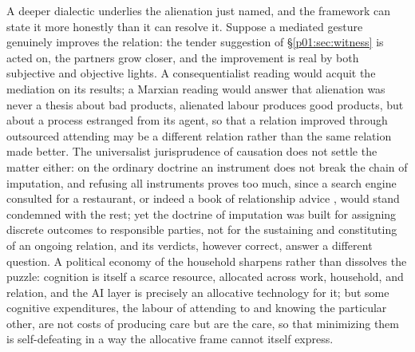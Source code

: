 A deeper dialectic underlies the alienation just named, and the framework can state it more honestly than it can resolve it. Suppose a mediated gesture genuinely improves the relation: the tender suggestion of §\ref{p01:sec:witness} is acted on, the partners grow closer, and the improvement is real by both subjective and objective lights. A consequentialist reading would acquit the mediation on its results; a Marxian reading would answer that alienation was never a thesis about bad products, alienated labour produces good products, but about a process estranged from its agent, so that a relation improved through outsourced attending may be a different relation rather than the same relation made better. The universalist jurisprudence of causation does not settle the matter either: on the ordinary doctrine an instrument does not break the chain of imputation, and refusing all instruments proves too much, since a search engine consulted for a restaurant, or indeed a book of relationship advice \parencite{chapman1992five}, would stand condemned with the rest; yet the doctrine of imputation was built for assigning discrete outcomes to responsible parties, not for the sustaining and constituting of an ongoing relation, and its verdicts, however correct, answer a different question. A political economy of the household sharpens rather than dissolves the puzzle: cognition is itself a scarce resource, allocated across work, household, and relation, and the AI layer is precisely an allocative technology for it; but some cognitive expenditures, the labour of attending to and knowing the particular other, are not costs of producing care but are the care, so that minimizing them is self-defeating in a way the allocative frame cannot itself express.

